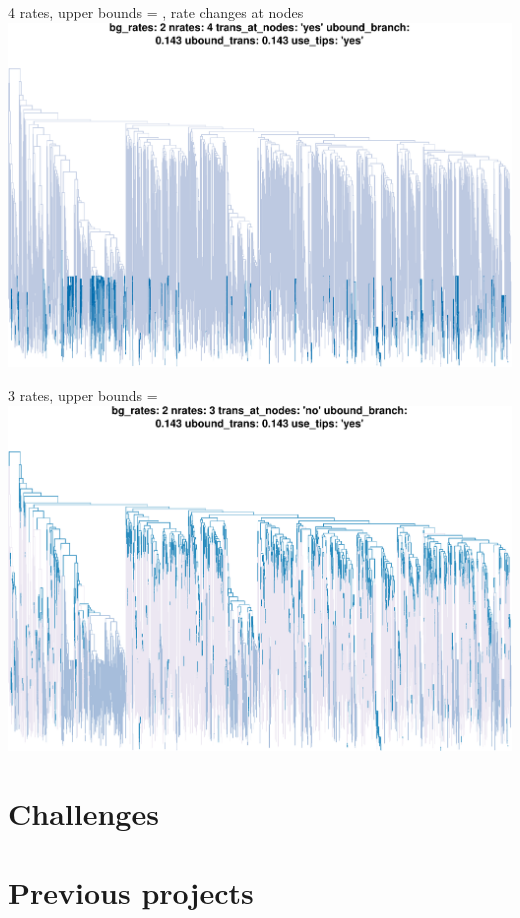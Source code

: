 \documentclass{beamer}
\begin{document}
\begin{frame}{4 rates, upper bounds = , rate changes at nodes}
    \includegraphics[width=\textwidth, trim=0 0 0 0.8in, clip=true]{pcbr2}
\end{frame}

\begin{frame}{3 rates, upper bounds = }
    \includegraphics[width=\textwidth, trim=0 0 0 0.8in, clip=true]{pcbr1}
\end{frame}

\section{Challenges}

\section{Previous projects}
\end{document}
